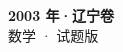 \documentclass[zihao=-4, a4paper]{ctexart}
\begin{document}
\begin{center}
  {\Large\bfseries 2003 年·辽宁卷}\\[4pt]
  {\large 数学 · 试题版}
\end{center}
\medskip
{}

\end{document}
